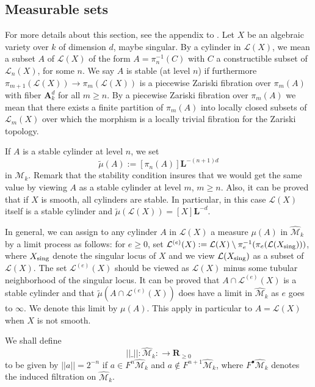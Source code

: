 \documentclass[english,12pt]{amsart}
\def\AA{{\mathbf A}}
\def\LL{{\mathbf L}}
\def\RR{{\mathbf R}}
\def\cL{{\mathcal L}}
\def\cM{{\mathcal M}}
\theoremstyle{definition}
\theoremstyle{remark}
\theoremstyle{plain}
\numberwithin{equation}{subsection}
\def\AA{{\mathbf A}}
\def\LL{{\mathbf L}}
\def\RR{{\mathbf R}}
\def\cL{{\mathcal L}}
\def\cM{{\mathcal M}}
\begin{document}
\subsection{Measurable sets}\label{123}For more details
about this section, see the appendix to \cite{compositio}.
Let $X$ be an algebraic variety over $k$
of dimension $d$, maybe singular.
By a cylinder 
in $\cL ( X)$, we mean a subset $A$ of $\cL (X)$
of the form $A = \pi_n^{-1} (C)$ with $C$ a constructible subset
of $\cL_n (X)$, for some $n$.
We say $A$ is stable (at level $n$) if furthermore
$\pi_{m + 1} (\cL (X)) \rightarrow \pi_{m} (\cL (X))$ is a piecewise Zariski fibration over
$\pi_m (A)$ with fiber $\AA^d_k$ for all $m \geq n$. By
a piecewise Zariski
fibration over
$\pi_m (A)$ we mean that there exists a finite  partition of $\pi_m (A)$
into locally closed subsets of $\cL_m (X)$ over which the morphism is
a locally trivial fibration for the Zariski topology.


If $A$ is a stable cylinder at level $n$, we set
$$
\tilde \mu (A) := [\pi_n (A) ] \LL^{- (n + 1) d}
$$
in $\cM_k$.
Remark that the stability condition insures that we would get the same value
by viewing $A$ as a stable cylinder at level $m$, $m \geq n$.
Also, it can be proved that if $X$ is smooth, all cylinders are stable.
In particular, in this case $\cL (X)$ itself is a stable
cylinder and $\tilde \mu (\cL (X)) = [X] \LL^{-d}$.


In general, we can assign to any cylinder
$A$ in $\cL (X)$ a measure $\mu (A)$ in $\widehat \cM_k$
by a limit process as follows:
for $e \geq 0$, set
$\cL^{(e)} (X) := \cL (X) \setminus \pi^{-1}_e (\pi_e (\cL (X_{\rm sing})))$,
where $X_{\rm sing}$ denote the singular locus of $X$ and we view 
$\cL (X_{\rm sing})$ as a subset of $\cL (X)$.
The set $\cL^{(e)} (X)$ should be viewed as $\cL (X)$ minus some tubular neighborhood
of the singular locus.
It can be proved that $A \cap 
\cL^{(e)} (X)$ is a stable cylinder
and that $\tilde \mu (A \cap 
\cL^{(e)} (X))$ does have a limit in $\widehat \cM_k$ as $e$ goes to $\infty$.
We denote this limit by  $\mu (A)$. This apply in particular to $A = \cL (X)$
when $X$ is not smooth.





We shall define
$$\vert \vert \_ \vert \vert : \widehat \cM_k : \rightarrow \RR_{\geq 0}$$
to be given by $\vert \vert a \vert \vert = 2^{-n}$
if $a \in F^n\widehat \cM_k$ and $a \notin F^{n + 1}\widehat \cM_k$, 
where $F^{\bullet} \widehat \cM_k$
denotes the induced filtration on $\widehat \cM_k$.
\end{document}
